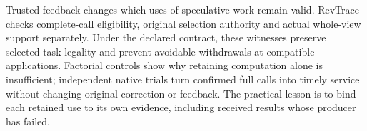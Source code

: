 Trusted feedback changes which uses of speculative work remain valid.
RevTrace checks complete-call eligibility, original selection authority
and actual whole-view support separately. Under the declared contract,
these witnesses preserve selected-task legality and prevent avoidable
withdrawals at compatible applications. Factorial controls show why
retaining computation alone is insufficient; independent native trials
turn confirmed full calls into timely service without changing original
correction or feedback. The practical lesson is to bind each retained use
to its own evidence, including received results whose producer has failed.
